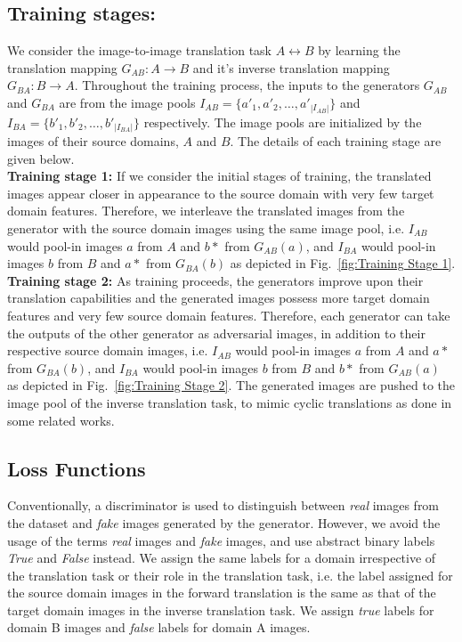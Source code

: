 \documentclass[a4paper,twoside]{article}
\begin{document}
\subsection{Training stages:}
\label{training stages}
\noindent
We consider the image-to-image translation task $A \leftrightarrow B$ by learning the translation mapping $G_{AB}:A\rightarrow B$ and it's inverse translation mapping $G_{BA}:B\rightarrow A$. Throughout the training process, the inputs to the generators $G_{AB}$ and $G_{BA}$ are from the image pools $I_{AB} = \{a'_1, a'_2, \dots, a'_{|I_{AB}|}\}$ and $I_{BA} =  \{b'_1, b'_2, \dots, b'_{|I_{BA}|}\}$ respectively. The image pools are initialized by the images of their source domains, $A$ and $B$. The details of each training stage are given below.
\\
\noindent \textbf{Training stage 1:} If we consider the initial stages of training, the translated images appear closer in appearance to the source domain with very few target domain features. Therefore, we interleave the translated images from the generator with the source domain images using the same image pool, i.e. $I_{AB}$ would pool-in images $a$ from $A$ and $b*$ from $G_{AB}(a)$, and $I_{BA}$ would pool-in images $b$ from $B$ and $a*$ from $G_{BA}(b)$ as depicted in Fig.~\ref{fig:Training Stage 1}.
\\
\noindent \textbf{Training stage 2:} As training proceeds, the generators improve upon their translation capabilities and the generated images possess more target domain features and very few source domain features. Therefore, each generator can take the outputs of the other generator as adversarial images, in addition to their respective source domain images, i.e. $I_{AB}$ would pool-in images $a$ from $A$ and $a*$ from $G_{BA}(b)$, and $I_{BA}$ would pool-in images $b$ from $B$ and $b*$ from $G_{AB}(a)$ as depicted in Fig.~\ref{fig:Training Stage 2}. The generated images are pushed to the image pool of the inverse translation task, to mimic cyclic translations as done in some related works.
\subsection{Loss Functions}
\label{Loss Functions}
\noindent
Conventionally, a discriminator is used to distinguish between \textit{real} images from the dataset and \textit{fake} images generated by the generator. However, we avoid the usage of the terms \textit{real} images and \textit{fake} images, and use abstract binary labels \textit{True} and \textit{False} instead. We assign the same labels for a domain irrespective of the translation task or their role in the translation task, i.e. the label assigned for the source domain images in the forward translation is the same as that of the target domain images in the inverse translation task. We assign \textit{true} labels for domain B images and \textit{false} labels for domain A images.
\end{document}
